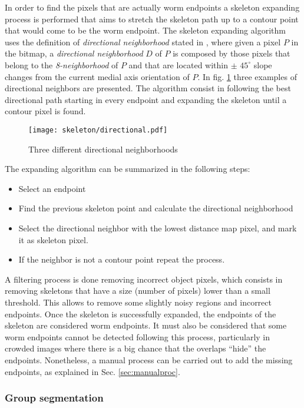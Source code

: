In order to find the pixels that are actually worm endpoints a skeleton expanding process
is performed that aims to stretch the skeleton path up to a contour point that 
would come to be the worm endpoint. The skeleton expanding algorithm uses the definition
of \emph{directional neighborhood} stated in \cite[p.334]{maxima}, where given 
a pixel $P$ in the bitmap, a \emph{directional neighborhood} $D$ of $P$ is 
composed by those pixels that belong to the \emph{8-neighborhood} of $P$ and that
are located within $\pm$ $45^{\circ}$ slope changes from the current medial axis 
orientation of $P$. In fig. \ref{fig:directional} three examples of directional
neighbors are presented. The algorithm consist in following the best directional path
starting in every endpoint and expanding the skeleton until a contour pixel is found.
 
\begin{figure}[h t b p ! H]
 \centering
   \texttt{[image: skeleton/directional.pdf]}
 \caption{Three different directional neighborhoods}
 \label{fig:directional}
\end{figure}

The expanding algorithm can be summarized in the following steps:
\begin{itemize}
\item Select an endpoint
\item Find the previous skeleton point and calculate the directional neighborhood
\item Select the directional neighbor with the lowest distance map pixel,
  and mark it as skeleton pixel.
\item If the neighbor is not a contour point repeat the process.
\end{itemize}

A filtering process is done removing incorrect object pixels, which consists in
removing skeletons that have a size (number of pixels) lower than a small 
threshold. This allows to remove some slightly noisy regions and incorrect endpoints.
Once the skeleton is successfully expanded, the endpoints of the skeleton are considered
worm endpoints. 
It must also be considered that some worm endpoints cannot be detected following this 
process, particularly in crowded images where there is a big chance that the
overlaps ``hide'' the endpoints. Nonetheless, a manual process can 
be carried out to add the missing endpoints, as explained in Sec. \ref{sec:manualproc}.



\subsubsection*{Group segmentation}

